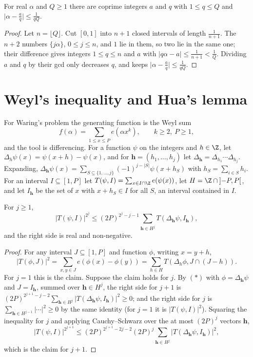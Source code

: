 \begin{lemma}[Dirichlet]\label{lem:dirichlet}
For real $\alpha$ and $Q\ge1$ there are coprime integers $a$ and $q$ with $1\le q\le Q$ and $\bigl|\alpha-\frac aq\bigr|\le\frac1{qQ}$.
\end{lemma}
\begin{proof}
Let $n=\lfloor Q\rfloor$. Cut $[0,1]$ into $n+1$ closed intervals of length $\frac1{n+1}$. The $n+2$ numbers $\{j\alpha\}$, $0\le j\le n$, and $1$ lie in them, so two lie in the same one; their difference gives integers $1\le q\le n$ and $a$ with $|q\alpha-a|\le\frac1{n+1}<\frac1Q$. Dividing $a$ and $q$ by their gcd only decreases $q$, and keeps $\bigl|\alpha-\frac aq\bigr|\le\frac1{qQ}$.
\end{proof}

\section{Weyl's inequality and Hua's lemma}

For Waring's problem the generating function is the Weyl sum
\[
f(\alpha)=\sum_{1\le x\le P}e(\alpha x^k),\qquad k\ge2,\ P\ge1,
\]
and the tool is differencing. For a function $\psi$ on the integers and $h\in\Z$, let $\Delta_h\psi(x)=\psi(x+h)-\psi(x)$, and for $\mathbf h=(h_1,\dots,h_j)$ let $\Delta_{\mathbf h}=\Delta_{h_1}\cdots\Delta_{h_j}$. Expanding, $\Delta_{\mathbf h}\psi(x)=\sum_{S\subseteq\{1,\dots,j\}}(-1)^{j-|S|}\psi(x+h_S)$ with $h_S=\sum_{i\in S}h_i$. For an interval $I\subseteq[1,P]$ let $T(\psi,I)=\sum_{x\in I\cap\Z}e(\psi(x))$, let $H=\Z\cap\left]-P,P\right[$, and let $I_{\mathbf h}$ be the set of $x$ with $x+h_S\in I$ for all $S$, an interval contained in $I$.

\begin{lemma}\label{lem:weyldiff}
For $j\ge1$,
\[
|T(\psi,I)|^{2^j}\le(2P)^{2^j-j-1}\sum_{\mathbf h\in H^j}T(\Delta_{\mathbf h}\psi,I_{\mathbf h}),
\]
and the right side is real and non-negative.
\end{lemma}
\begin{proof}
For any interval $J\subseteq[1,P]$ and function $\phi$, writing $x=y+h$,
\[
|T(\phi,J)|^2=\sum_{x,y\in J}e(\phi(x)-\phi(y))=\sum_{h\in H}T(\Delta_h\phi,J\cap(J-h)).\tag{$\ast$}
\]
For $j=1$ this is the claim. Suppose the claim holds for $j$. By $(\ast)$ with $\phi=\Delta_{\mathbf h}\psi$ and $J=I_{\mathbf h}$, summed over $\mathbf h\in H^j$, the right side for $j+1$ is $(2P)^{2^{j+1}-j-2}\sum_{\mathbf h\in H^j}|T(\Delta_{\mathbf h}\psi,I_{\mathbf h})|^2\ge0$; and the right side for $j$ is $\sum_{\mathbf h\in H^{j-1}}|\cdots|^2\ge0$ by the same identity (for $j=1$ it is $|T(\psi,I)|^2$). Squaring the inequality for $j$ and applying Cauchy--Schwarz over the at most $(2P)^j$ vectors $\mathbf h$,
\[
|T(\psi,I)|^{2^{j+1}}\le(2P)^{2^{j+1}-2j-2}(2P)^j\sum_{\mathbf h\in H^j}|T(\Delta_{\mathbf h}\psi,I_{\mathbf h})|^2,
\]
which is the claim for $j+1$.
\end{proof}

